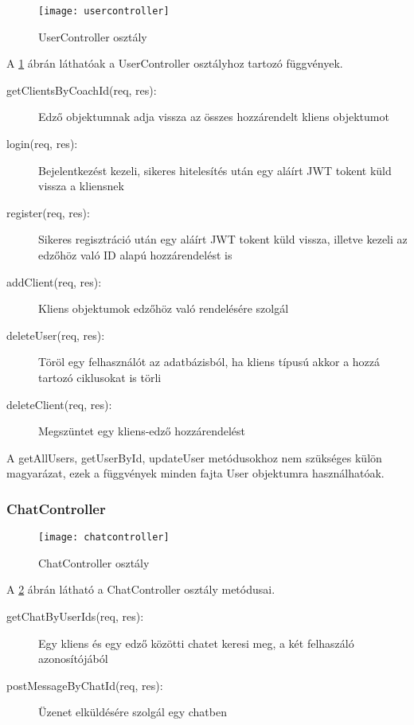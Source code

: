 \begin{figure}[H]
	\centering
	\texttt{[image: usercontroller]}
	\caption{UserController osztály}
	\label{fig:usercontroller}
\end{figure}

A \ref{fig:usercontroller} ábrán láthatóak a UserController osztályhoz tartozó függvények.

\begin{description}
	\item[getClientsByCoachId(req, res):] Edző objektumnak adja vissza az összes hozzárendelt kliens objektumot
	\item[login(req, res):] Bejelentkezést kezeli, sikeres hitelesítés után egy aláírt JWT tokent küld vissza a kliensnek
	\item[register(req, res):] Sikeres regisztráció után egy aláírt JWT tokent küld vissza, illetve kezeli az edzőhöz való ID alapú hozzárendelést is
	\item[addClient(req, res):] Kliens objektumok edzőhöz való rendelésére szolgál
	\item[deleteUser(req, res):] Töröl egy felhasználót az adatbázisból, ha kliens típusú akkor a hozzá tartozó ciklusokat is törli
	\item[deleteClient(req, res):] Megszüntet egy kliens-edző hozzárendelést
\end{description}

A getAllUsers, getUserById, updateUser metódusokhoz nem szükséges külön magyarázat, ezek a függvények minden fajta User objektumra használhatóak.

\subsubsection{ChatController}

\begin{figure}[H]
	\centering
	\texttt{[image: chatcontroller]}
	\caption{ChatController osztály}
	\label{fig:chatcontroller}
\end{figure}

A \ref{fig:chatcontroller} ábrán látható a ChatController osztály metódusai.

\begin{description}
	\item[getChatByUserIds(req, res):] Egy kliens és egy edző közötti chatet keresi meg, a két felhaszáló azonosítójából
	\item[postMessageByChatId(req, res):] Üzenet elküldésére szolgál egy chatben
\end{description}


